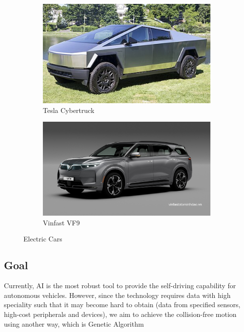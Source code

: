 \begin{figure}[ht]
    \centering
    \begin{subfigure}[b]{0.45\textwidth}
        \centering
        \includegraphics[width=\textwidth]{img/tesla_cybertruck.jpg}
        \caption{Tesla Cybertruck}
    \end{subfigure}
    \hfill
    \begin{subfigure}[b]{0.47\textwidth}
        \centering
        \includegraphics[width=\textwidth]{img/vinfast.jpg}
        \caption{Vinfast VF9}
    \end{subfigure}
    \caption{Electric Cars} %
\end{figure}

\subsection{Goal}
    Currently, AI is the most robust tool to provide the self-driving capability for autonomous vehicles. However, since the technology requires data with high speciality such that it may become hard to obtain (data from specified sensors, high-cost peripherals and devices), we aim to achieve the collision-free motion using another way, which is Genetic Algorithm
